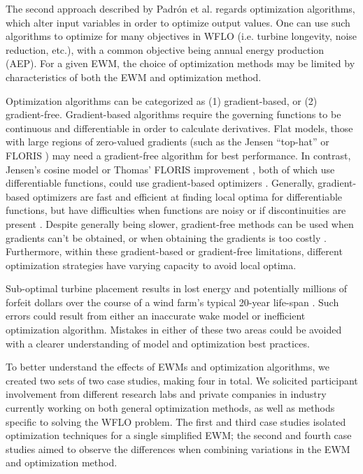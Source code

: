 The second approach described by Padr\'on et al. regards optimization algorithms, which alter input variables in order to optimize output values.
One can use such algorithms to optimize for many objectives in WFLO (i.e. turbine longevity, noise reduction, etc.), with a common objective being annual energy production (AEP).
For a given EWM, the choice of optimization methods may be limited by characteristics of both the EWM and optimization method.

Optimization algorithms can be categorized as (1) gradient-based, or (2) gradient-free.
Gradient-based algorithms require the governing functions to be continuous and differentiable in order to calculate derivatives.
Flat models, those with large regions of zero-valued gradients (such as the Jensen ``top-hat'' \cite{Jensen1983} or FLORIS \cite{Gebraad2014}) may need a gradient-free algorithm for best performance.
In contrast, Jensen's cosine model or Thomas' FLORIS improvement \cite{thomas2017}, both of which use differentiable functions, could use gradient-based optimizers \cite{Nocedal2006}.
Generally, gradient-based optimizers are fast and efficient at finding local optima for differentiable functions, but have difficulties when functions are noisy or if discontinuities are present \cite{Nocedal2006}.
Despite generally being slower, gradient-free methods can be used when gradients can't be obtained, or when obtaining the gradients is too costly \cite{Kramer2011}.
Furthermore, within these gradient-based or gradient-free limitations, different optimization strategies have varying capacity to avoid local optima.

Sub-optimal turbine placement results in lost energy and potentially millions of forfeit dollars over the course of a wind farm's typical 20-year life-span \cite{HerbertAcero2014}.
Such errors could result from either an inaccurate wake model or inefficient optimization algorithm.
Mistakes in either of these two areas could be avoided with a clearer understanding of model and optimization best practices.

To better understand the effects of EWMs and optimization algorithms, we created two sets of two case studies, making four in total.
We solicited participant involvement from different research labs and private companies in industry currently working on both general optimization methods, as well as methods specific to solving the WFLO problem.
The first and third case studies isolated optimization techniques for a single simplified EWM; the second and fourth case studies aimed to observe the differences when combining variations in the EWM and optimization method.

